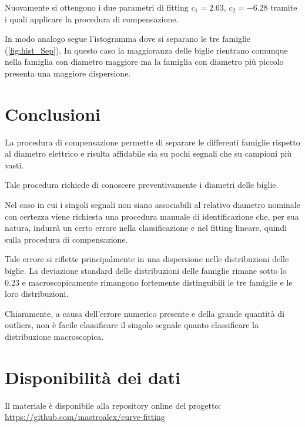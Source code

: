 Nuovamente si ottengono i due parametri di fitting $c_1=2.63$, $c_2=-6.28$ tramite i quali applicare la procedura di compensazione.

In modo analogo segue l'istogramma dove si separano le tre famiglie (\cref{fig:hist_Sep}). In questo caso la maggioranza delle biglie rientrano comunque nella famiglia con diametro maggiore ma la famiglia con diametro più piccolo presenta una maggiore dispersione. 



\section{Conclusioni}

La procedura di compensazione permette di separare le differenti famiglie rispetto al diametro elettrico e risulta affidabile sia su pochi segnali che su campioni più vasti.

Tale procedura richiede di conoscere preventivamente i diametri delle biglie. 

Nel caso in cui i singoli segnali non siano associabili al relativo diametro nominale con certezza viene richiesta una procedura manuale di identificazione che, per sua natura, indurrà un certo errore nella classificazione e nel fitting lineare, quindi sulla procedura di compensazione. 

Tale errore si riflette principalmente in una dispersione nelle distribuzioni delle biglie. La deviazione standard delle distribuzioni delle famiglie rimane sotto lo 0.23 e macroscopicamente rimangono fortemente distinguibili le tre famiglie e le loro distribuzioni. 

Chiaramente, a causa dell'errore numerico presente e della grande quantità di outliers, non è facile classificare il singolo segnale quanto classificare la distribuzione macroscopica.

\raggedbottom
\pagebreak
\section*{Disponibilità dei dati}

Il materiale è disponibile alla repository online del progetto: \url{https://github.com/mastroalex/curve-fitting}


\raggedbottom
\printbibliography[title=Riferimenti]






